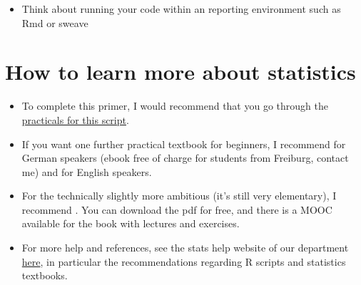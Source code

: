 \documentclass[a4paper,twoside]{tufte-book}\usepackage[]{graphicx}\usepackage[]{color}
\begin{document}
{\begin{itemize}
\item{Think about running your code within an reporting environment such as Rmd or sweave}



\end{itemize}

\section{How to learn more about statistics}\label{sec: further readings}


\begin{itemize}

\item To complete this primer, I would recommend that you go through the \href{https://github.com/florianhartig/ResearchSkills/tree/master/Labs/Statistics}{practicals for this script}.

\item If you want one further practical textbook for beginners, I recommend \citet{Dormann-ParametrischeStatistik-2013} for German speakers (ebook free of charge for students from Freiburg, contact me) and \citet{Gotelli-PrimerEcologicalStatistics-2004} for English speakers. 

\item For the technically slightly more ambitious (it's still very elementary), I recommend \citet{James-IntroductiontoStatistical-2013}. You can download the pdf for free, and there is a MOOC available for the book with lectures and exercises. 

\item For more help and references, see the stats help website of our department  \href{http://biometry.github.io/APES/}{here}, in particular the recommendations regarding R scripts and statistics textbooks. 

\end{itemize}







\begin{appendices}


\end{appendices}}
\end{document}
